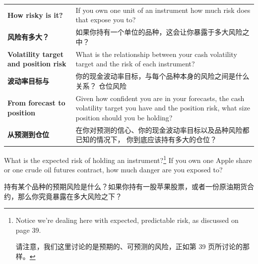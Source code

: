 \begin{bilingualtableblock} \begin{tabularx}{\textwidth}{@{} L{0.30\textwidth} Y@{}}\textbf{How risky is it?} & If you own one unit of an instrument how much risk does that expose you to? \\

\textbf{风险有多大？} & 如果你持有一个单位的品种，这会让你暴露于多大风险之中？ \\
\textbf{Volatility target and position risk} & What is the relationship between your cash volatility target and the risk of each instrument? \\
\textbf{波动率目标与} & 你的现金波动率目标，与每个品种本身的风险之间是什么关系？ 仓位风险 \\
\textbf{From forecast to position} & Given how confident you are in your forecasts, the cash volatility target you have and the position risk, what size position should you be holding? \\
\textbf{从预测到仓位} & 在你对预测的信心、你的现金波动率目标以及品种风险都已知的情况下， 你到底应该持有多大的仓位？ \\
\end{tabularx}
\end{bilingualtableblock}


\begin{englishblock} What is the expected risk of holding an instrument?\footnote{Notice we're dealing here with expected, predictable risk, as discussed on page 39. \par 请注意，我们这里讨论的是预期的、可预测的风险，正如第 39 页所讨论的那样。} If you own one Apple share or one crude oil futures contract, how much danger are you exposed to? \end{englishblock}

\begin{chineseblock}持有某个品种的预期风险是什么？如果你持有一股苹果股票，或者一份原油期货合约，那么你究竟暴露在多大风险之下？\end{chineseblock}


